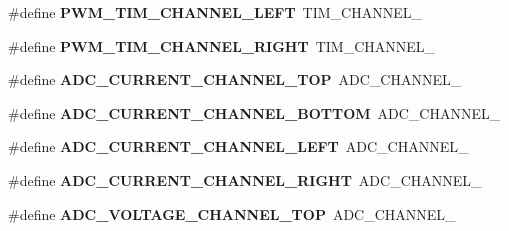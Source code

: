 \begin{DoxyCompactItemize}
\item 
\hypertarget{group__eps__configuration_gab0141f054748907ddd330eec77c792b4}{\#define {\bfseries P\-W\-M\-\_\-\-T\-I\-M\-\_\-\-C\-H\-A\-N\-N\-E\-L\-\_\-\-L\-E\-F\-T}~T\-I\-M\-\_\-\-C\-H\-A\-N\-N\-E\-L\-\_}\label{group__eps__configuration_gab0141f054748907ddd330eec77c792b4}

\item 
\hypertarget{group__eps__configuration_gaa7d166d2398a08ae1715098ae5582043}{\#define {\bfseries P\-W\-M\-\_\-\-T\-I\-M\-\_\-\-C\-H\-A\-N\-N\-E\-L\-\_\-\-R\-I\-G\-H\-T}~T\-I\-M\-\_\-\-C\-H\-A\-N\-N\-E\-L\-\_}\label{group__eps__configuration_gaa7d166d2398a08ae1715098ae5582043}

\item 
\hypertarget{group__eps__configuration_ga212f05f75d70ead2d599051e76f2e3e8}{\#define {\bfseries A\-D\-C\-\_\-\-C\-U\-R\-R\-E\-N\-T\-\_\-\-C\-H\-A\-N\-N\-E\-L\-\_\-\-T\-O\-P}~A\-D\-C\-\_\-\-C\-H\-A\-N\-N\-E\-L\-\_}\label{group__eps__configuration_ga212f05f75d70ead2d599051e76f2e3e8}

\item 
\hypertarget{group__eps__configuration_ga77edb9c9e4873efef25b541df89ecc07}{\#define {\bfseries A\-D\-C\-\_\-\-C\-U\-R\-R\-E\-N\-T\-\_\-\-C\-H\-A\-N\-N\-E\-L\-\_\-\-B\-O\-T\-T\-O\-M}~A\-D\-C\-\_\-\-C\-H\-A\-N\-N\-E\-L\-\_}\label{group__eps__configuration_ga77edb9c9e4873efef25b541df89ecc07}

\item 
\hypertarget{group__eps__configuration_ga7fb1c0a818e5840c0ab4eb5fe86c9bc4}{\#define {\bfseries A\-D\-C\-\_\-\-C\-U\-R\-R\-E\-N\-T\-\_\-\-C\-H\-A\-N\-N\-E\-L\-\_\-\-L\-E\-F\-T}~A\-D\-C\-\_\-\-C\-H\-A\-N\-N\-E\-L\-\_}\label{group__eps__configuration_ga7fb1c0a818e5840c0ab4eb5fe86c9bc4}

\item 
\hypertarget{group__eps__configuration_ga765685192eecded82dad18c3ae5cca71}{\#define {\bfseries A\-D\-C\-\_\-\-C\-U\-R\-R\-E\-N\-T\-\_\-\-C\-H\-A\-N\-N\-E\-L\-\_\-\-R\-I\-G\-H\-T}~A\-D\-C\-\_\-\-C\-H\-A\-N\-N\-E\-L\-\_}\label{group__eps__configuration_ga765685192eecded82dad18c3ae5cca71}

\item 
\hypertarget{group__eps__configuration_ga769167f7a37ce096a2772c603bbf3ee1}{\#define {\bfseries A\-D\-C\-\_\-\-V\-O\-L\-T\-A\-G\-E\-\_\-\-C\-H\-A\-N\-N\-E\-L\-\_\-\-T\-O\-P}~A\-D\-C\-\_\-\-C\-H\-A\-N\-N\-E\-L\-\_}\label{group__eps__configuration_ga769167f7a37ce096a2772c603bbf3ee1}


\end{DoxyCompactItemize}
